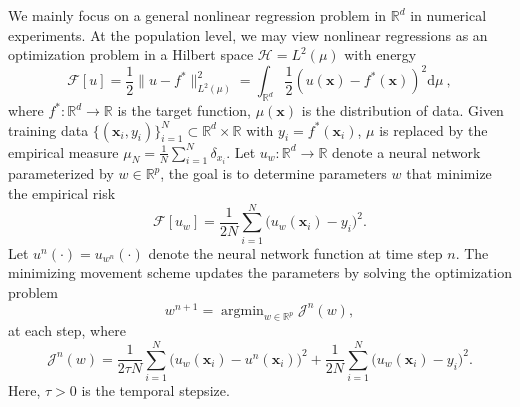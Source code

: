 \documentclass[twoside,11pt]{article}
\newcommand{\dd}{\mathrm{d}}
\newcommand{\x}{{\bm x}}
\newcommand{\argmin}{\mathop{\mathrm{arg min}}}
\begin{document}
We mainly focus on a general nonlinear regression problem in $\mathbb{R}^d$ in numerical experiments. At the population level, we may view nonlinear regressions as an optimization problem in a Hilbert space $\mathcal H=L^2(\mu)$ with energy
\[
\mathcal F[u]=\frac12\|u-f^\ast\|_{L^2(\mu)}^2 = \int_{\mathbb{R}^d} \frac{1}{2} (u(\x) - f^*(\x))^2 \dd \mu \ ,
\] 
where $f^*: \mathbb{R}^d \to \mathbb{R}$ is the target function, $\mu(\x)$ is the distribution of data. Given training data $\{(\x_i,y_i)\}_{i=1}^N \subset \mathbb{R}^d\times\mathbb{R}$ with $y_i=f^\ast(\x_i)$, $\mu$ is replaced by the empirical measure \( \mu_N=\frac1N\sum_{i=1}^N \delta_{x_i}\). Let $u_{w}:\mathbb{R}^d\to\mathbb{R}$ denote a neural network parameterized by $w\in\mathbb{R}^p$, the goal is to determine parameters $w$ that minimize the empirical risk
\begin{equation}
    \mathcal F[u_w]
    =
    \frac{1}{2N}\sum_{i=1}^N \bigl(u_w(\x_i)-y_i\bigr)^2.
\end{equation}
Let $u^n(\cdot)=u_{w^n}(\cdot)$ denote the neural network function at time step $n$. The minimizing movement scheme updates the parameters by solving the optimization problem
\begin{equation}
    w^{n+1}
    =
    \argmin_{w\in\mathbb{R}^p} \mathcal J^n(w),
\end{equation}
at each step, where
\begin{equation}\label{J_Reg}
    \mathcal J^n(w)
    =
    \frac{1}{2\tau N}\sum_{i=1}^N \bigl(u_w(\x_i)-u^n(\x_i)\bigr)^2
    +
    \frac{1}{2N}\sum_{i=1}^N \bigl(u_w(\x_i)-y_i\bigr)^2.
\end{equation}
Here, $\tau>0$ is the temporal stepsize.
\end{document}
